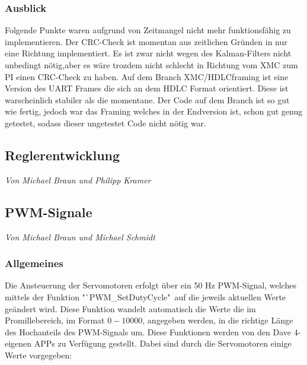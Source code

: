 \documentclass[12pt,a4paper,bibliography=totoc,listof=totoc]{scrartcl}
\begin{document}
\subsubsection{Ausblick}
Folgende Punkte waren aufgrund von Zeitmangel nicht mehr funktionsfähig zu implementieren.
Der CRC-Check ist momentan aus zeitlichen Gründen in nur eine Richtung implementiert. Es ist zwar nicht wegen des Kalman-Filters nicht unbedingt nötig,aber
 es wäre trozdem nicht schlecht in Richtung vom XMC zum PI einen CRC-Check zu haben. 
Auf dem Branch XMC/HDLCframing ist eine Version des UART Frames die sich an dem HDLC Format orientiert. Diese 
ist warscheinlich stabiler als die momentane. Der Code auf dem Branch ist so gut wie fertig, jedoch war das Framing welches 
in der Endversion ist, schon gut genug getestet, sodass dieser ungetestet Code nicht nötig war.
\subsection{Reglerentwicklung}
\textit{Von Michael Braun und Philipp Kramer}\newline

\subsection{PWM-Signale}
\textit{Von Michael Braun und Michael Schmidt}\newline
\subsubsection{ Allgemeines}
Die Ansteuerung der Servomotoren erfolgt über ein 50 Hz PWM-Signal, welches mittels der Funktion 
"`PWM\_SetDutyCycle"\, auf die jeweils aktuellen Werte geändert wird. Diese Funktion wandelt automatisch 
die Werte die im Promillebereich, im Format $0-10000$, angegeben werden, in die richtige Länge des 
Hochanteils des PWM-Signals um. Diese Funktionen werden von den Dave 4- eigenen APPs zu Verfügung 
gestellt. Dabei sind durch die Servomotoren einige Werte vorgegeben:
\end{document}
